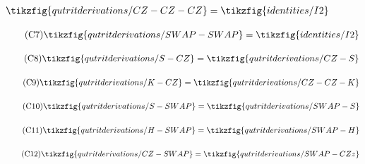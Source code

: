 \begin{figure}[ht]
{\begin{minipage}{.975\textwidth}
\begin{center}
\begin{subfigure}{0.36\textwidth}
\begin{align}
                \tikzfig{qutritderivations/CZ-CZ-CZ} = \tikzfig{identities/I2}
            \end{align}
        \end{subfigure}
        \begin{subfigure}{0.44\textwidth}
            \begin{align}\label{qt-SWAPSWAP}\tag{C7}
                \tikzfig{qutritderivations/SWAP-SWAP} = \tikzfig{identities/I2}
            \end{align}
        \end{subfigure}\vspace{-0.5em}
        \begin{subfigure}{0.36\textwidth}
            \begin{align}\label{qt-C7}\tag{C8}
                \tikzfig{qutritderivations/S-CZ} = \tikzfig{qutritderivations/CZ-S}
            \end{align}
        \end{subfigure}
        \begin{subfigure}{0.41\textwidth}
            \begin{align}\label{qt-C8}\tag{C9}
                \tikzfig{qutritderivations/K-CZ}
                =
                \tikzfig{qutritderivations/CZ-CZ-K}
            \end{align}
        \end{subfigure}\vspace{-0.5em}
        \begin{subfigure}{0.47\textwidth}
            \begin{align}\label{qt-SSWAP}\tag{C10}
                \tikzfig{qutritderivations/S-SWAP} = \tikzfig{qutritderivations/SWAP-S}
            \end{align}
        \end{subfigure}
        \begin{subfigure}{0.47\textwidth}
            \begin{align}\label{qt-C9}\tag{C11}
                \tikzfig{qutritderivations/H-SWAP} = \tikzfig{qutritderivations/SWAP-H}
            \end{align}
        \end{subfigure}\vspace{-0.5em}
        \begin{subfigure}{0.47\textwidth}
            \begin{align}\label{qt-CZSWAP}\tag{C12}
                \tikzfig{qutritderivations/CZ-SWAP} = \tikzfig{qutritderivations/SWAP-CZz}

\end{align}
\end{subfigure}
\end{center}
\end{minipage}}
\end{figure}
